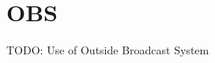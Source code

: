 \documentclass[../StudioOperationGuide.tex]{subfiles}
\begin{document}
\chapter{OBS}
TODO: Use of Outside Broadcast System
\end{document}
